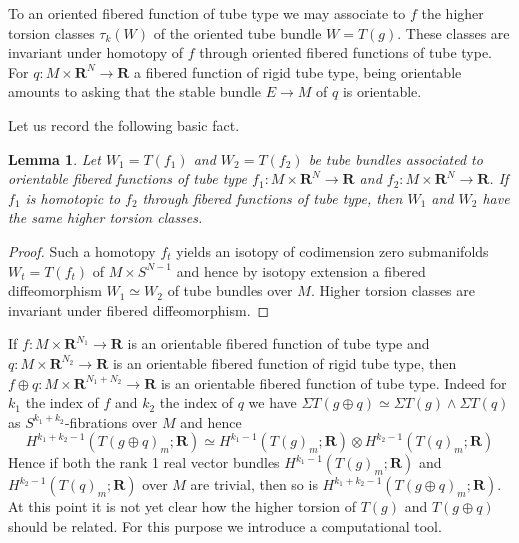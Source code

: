 \documentclass{amsart}
\def\bR{\mathbf{R}}
\newtheorem{lemma}[theorem]{Lemma}
\theoremstyle{definition}
\theoremstyle{remark}
\newtheorem{inductive lemma}[theorem]{Inductive Lemma}
\begin{document}
To an  oriented fibered function of tube type we may associate to $f$ the higher torsion classes $\tau_k(W)$ of the oriented tube bundle $W=T(g)$. These classes are invariant under homotopy of $f$ through oriented fibered functions of tube type. For $q:M \times \bR^N \to \bR$ a fibered function of rigid tube type, being orientable amounts to asking that the stable bundle $E \to M$ of $q$ is orientable.

Let us record the following basic fact.

\begin{lemma} Let $W_1=T(f_1)$ and $W_2=T(f_2)$ be tube bundles associated to orientable fibered functions of tube type $f_1:M \times \bR^N \to \bR$ and $f_2:M \times \bR^N \to \bR$. If $f_1$ is homotopic to $f_2$ through fibered functions of tube type, then $W_1$ and $W_2$ have the same higher torsion classes. \end{lemma}

\begin{proof} Such a homotopy $f_t$ yields an isotopy of codimension zero submanifolds $W_t=T(f_t)$ of $M \times S^{N-1}$ and hence by isotopy extension a fibered diffeomorphism $W_1 \simeq W_2$ of tube bundles over $M$. Higher torsion classes are invariant under fibered diffeomorphism. \end{proof}


If $f:M \times \bR^{N_1} \to \bR$ is an orientable fibered function of tube type and $q:M \times \bR^{N_2} \to \bR$ is an orientable fibered function of rigid tube type, then $f \oplus q:M \times \bR^{N_1+N_2} \to \bR$ is an orientable fibered function of tube type. Indeed for $k_1$ the index of $f$ and $k_2$ the index of $q$ we have $\Sigma T(g \oplus q) \simeq \Sigma T(g) \land \Sigma T(q)$ as $S^{k_1+k_2}$-fibrations over $M$ and hence $$H^{k_1+k_2-1}(T(g \oplus q)_m ;\bR) \simeq H^{k_1-1}(T(g)_m;\bR) \otimes H^{k_2-1}(T(q)_m;\bR)$$
Hence if both the rank 1 real vector bundles $H^{k_1-1}(T(g)_m;\bR)$ and $H^{k_2-1}(T(q)_m;\bR)$ over $M$  are trivial, then so is $H^{k_1+k_2-1}(T(g \oplus q)_m ;\bR)$. At this point it is not yet clear how the higher torsion of $T(g)$ and $T(g \oplus q)$ should be related. For this purpose we introduce a computational tool. 
\end{document}
